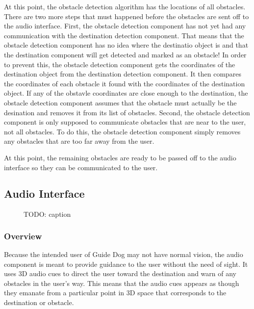 At this point, the obstacle detection algorithm has the locations of all
obstacles. There are two more steps that must happened before the obstacles are
sent off to the audio interface. First, the obstacle detection component has not
yet had any communication with the destination detection component. That means
that the obstacle detection component has no idea where the destinatio object is
and that the destination component will get detected and marked as an obstacle!
In order to prevent this, the obstacle detection component gets the coordinates
of the destination object from the destination detection component. It then
compares the coordinates of each obstacle it found with the coordinates of the
destination object. If any of the obstavle coordinates are close enough to the
destination, the obstacle detection component assumes that the obstacle must
actually be the desination and removes it from its list of obstacles. Second,
the obstacle detection component is only supposed to communicate obstacles that
are near to the user, not all obstacles. To do this, the obstacle detection
component simply removes any obstacles that are too far away from the user.

At this point, the remaining obstacles are ready to be passed off to the audio
interface so they can be communicated to the user.

\subsection{Audio Interface}
\label{sec:audio}

\begin{figure}
\caption{TODO: caption}
\label{fig:vsim}
\end{figure}

\subsubsection{Overview}
\label{sec:audio-overview}

Because the intended user of Guide Dog may not have normal vision, the audio 
component is meant to provide guidance to the user without the need of sight. It
uses 3D audio cues to direct the user toward the destination and warn of any 
obstacles in the user's way. This means that the audio cues appears as though
they emanate from a particular point in 3D space that corresponds to the
destination or obstacle.

